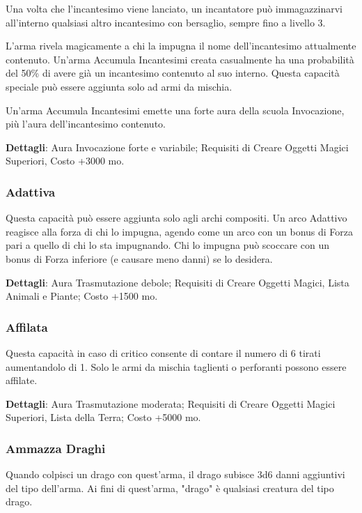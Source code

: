 \begin{multicols}{2}
	Una volta che l'incantesimo viene lanciato, un incantatore può immagazzinarvi all'interno qualsiasi altro incantesimo con bersaglio, sempre fino a livello 3.

	L'arma rivela magicamente a chi la impugna il nome dell'incantesimo attualmente contenuto. Un'arma Accumula Incantesimi creata casualmente ha una probabilità del 50\% di avere già un incantesimo contenuto al suo interno. Questa capacità speciale può essere aggiunta solo ad armi da mischia.

	Un'arma Accumula Incantesimi emette una forte aura della scuola Invocazione, più l'aura dell'incantesimo contenuto.

	\textbf{Dettagli}: Aura Invocazione forte e variabile; Requisiti di Creare Oggetti Magici Superiori, Costo +3000 mo.

	\subsubsection*{Adattiva}

	Questa capacità può essere aggiunta solo agli archi compositi. Un arco Adattivo reagisce alla forza di chi lo impugna, agendo come un arco con un bonus di Forza pari a quello di chi lo sta impugnando. Chi lo impugna può scoccare con un bonus di Forza inferiore (e causare meno danni) se lo desidera.

	\textbf{Dettagli}: Aura Trasmutazione debole; Requisiti di Creare Oggetti Magici, Lista Animali e Piante; Costo +1500 mo.

	\subsubsection*{Affilata}

	Questa capacità in caso di critico consente di contare il numero di 6 tirati aumentandolo di 1. Solo le armi da mischia taglienti o perforanti possono essere affilate.

	\textbf{Dettagli}: Aura Trasmutazione moderata; Requisiti di Creare Oggetti Magici Superiori, Lista della Terra; Costo +5000 mo.

	\subsubsection*{Ammazza Draghi}

	Quando colpisci un drago con quest'arma, il drago subisce 3d6 danni aggiuntivi del tipo dell'arma. Ai fini di quest'arma, "drago" è qualsiasi creatura del tipo drago.


\end{multicols}
